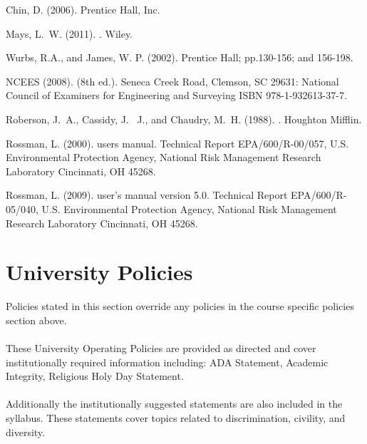 \documentclass[12pt]{article}
\begin{document}
\begin{thebibliography}{}
Chin, D. (2006). 
\newblock Prentice Hall, Inc.

Mays, L.~W. (2011).
.
\newblock Wiley.

Wurbs, R.A., and James, W. P. (2002).
\newblock Prentice Hall; pp.130-156; and 156-198. 

NCEES (2008).
 (8th
  ed.).
 Seneca Creek Road, Clemson, SC 29631: National Council of
  Examiners for Engineering and Surveying {ISBN 978-1-932613-37-7}.

Roberson, J.~A., Cassidy, J. ~J., and Chaudry, M.~H.  (1988).
.
\newblock Houghton Mifflin.

Rossman, L. (2000).
 users manual.
\newblock Technical Report EPA/600/R-00/057, U.S. Environmental Protection
  Agency, National Risk Management Research Laboratory Cincinnati, OH 45268.
  
Rossman, L. (2009).
 user's manual version 5.0.
\newblock Technical Report EPA/600/R-05/040, U.S. Environmental Protection
  Agency, National Risk Management Research Laboratory Cincinnati, OH 45268.


\section*{University Policies}
Policies stated in this section override any policies in the course specific policies section above.
~\\~\\
These University Operating Policies are provided as directed and cover institutionally required information including: 
ADA Statement, Academic Integrity, Religious Holy Day Statement.
\\~\\
Additionally the institutionally suggested statements are also included in the syllabus.  
These statements cover topics related to discrimination, civility, and diversity.  


\end{thebibliography}
\end{document}
